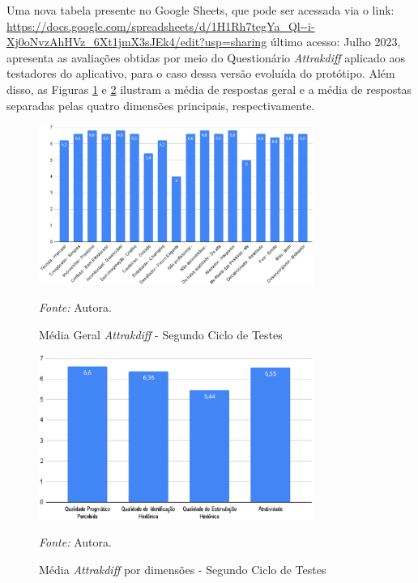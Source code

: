 Uma nova tabela presente no Google Sheets, que pode ser acessada via o link: 
\url{https://docs.google.com/spreadsheets/d/1H1Rh7tegYa_Ql--i-Xj0oNvzAhHVz_6Xt1jmX3sJEk4/edit?usp=sharing} último acesso: Julho 2023, apresenta as avaliações obtidas por meio do Questionário \textit{Attrakdiff} aplicado aos testadores do aplicativo, para o caso 
dessa versão evoluída do protótipo. Além disso, as Figuras \ref{fig28} e \ref{fig29} ilustram a média de respostas geral e a média de respostas separadas pelas quatro dimensões principais, respectivamente.

\begin{figure}[h!]
	\centering
	\caption{Média Geral \textit{Attrakdiff} - Segundo Ciclo de Testes}
	\begin{adjustbox}{center}
		\includegraphics[width=0.8\textwidth]{figuras/media-geral1.eps}
	\end{adjustbox}
	\begin{tablenotes}[flushleft]
		\centering
		\item \textit{Fonte:} Autora.
	\end{tablenotes}
	\label{fig28}
\end{figure}

\begin{figure}[h!]
	\centering
	\caption{Média \textit{Attrakdiff} por dimensões - Segundo Ciclo de Testes}
	\begin{adjustbox}{center}
		\includegraphics[width=0.8\textwidth]{figuras/media-separada1.eps}
	\end{adjustbox}
	\begin{tablenotes}[flushleft]
		\centering
		\item \textit{Fonte:} Autora.
	\end{tablenotes}
	\label{fig29}
\end{figure}

